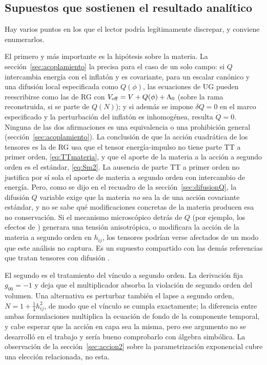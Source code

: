 \subsection{Supuestos que sostienen el resultado analítico}
\label{sec:supuestos}

Hay varios puntos en los que el lector podría legítimamente discrepar, y conviene enumerarlos.

El primero y más importante es la hipótesis sobre la materia. La sección~\ref{sec:acoplamiento} la precisa para el caso de un solo campo: si $Q$ intercambia energía con el inflatón y es covariante, para un escalar canónico y una difusión local especificada como $Q(\phi)$, las ecuaciones de UG pueden reescribirse como las de RG con $V_{\rm eff}=V+Q(\phi)+\Lambda_0$ (sobre la rama reconstruida, si se parte de $Q(N)$); y si además se impone $\delta Q=0$ en el marco especificado y la perturbación del inflatón es inhomogénea, resulta $\dot Q=0$. Ninguna de las dos afirmaciones es una equivalencia o una prohibición general (sección~\ref{sec:acoplamiento}). La conclusión de que la acción cuadrática de los tensores es la de RG usa que el tensor energía-impulso no tiene parte TT a primer orden, \eqref{eq:TTmateria}, y que el aporte de la materia a la acción a segundo orden es el estándar, \eqref{eq:Sm2}. La ausencia de parte TT a primer orden no justifica por sí sola el aporte de materia a segundo orden con intercambio de energía. Pero, como se dijo en el recuadro de la sección~\ref{sec:difusionQ}, la difusión $Q$ variable exige que la materia \emph{no} sea la de una acción covariante estándar, y no se sabe qué modificaciones concretas de la materia producen esa no conservación. Si el mecanismo microscópico detrás de $Q$ (por ejemplo, los efectos de \cite{josset17,perez19}) generara una tensión anisotrópica, o modificara la acción de la materia a segundo orden en $h_{ij}$, los tensores podrían verse afectados de un modo que este análisis no captura. Es un supuesto compartido con las demás referencias que tratan tensores con difusión \cite{fabris22}.

El segundo es el tratamiento del vínculo a segundo orden. La derivación fija $g_{00}=-1$ y deja que el multiplicador absorba la violación de segundo orden del volumen. Una alternativa es perturbar también el lapse a segundo orden, $N=1+\tfrac14h_{ij}^2$, de modo que el vínculo se cumpla exactamente; la diferencia entre ambas formulaciones multiplica la ecuación de fondo de la componente temporal, y cabe esperar que la acción en capa sea la misma, pero ese argumento no se desarrolló en el trabajo y sería bueno comprobarlo con álgebra simbólica. La observación de la sección~\ref{sec:accion2} sobre la parametrización exponencial cubre una elección relacionada, no esta.

